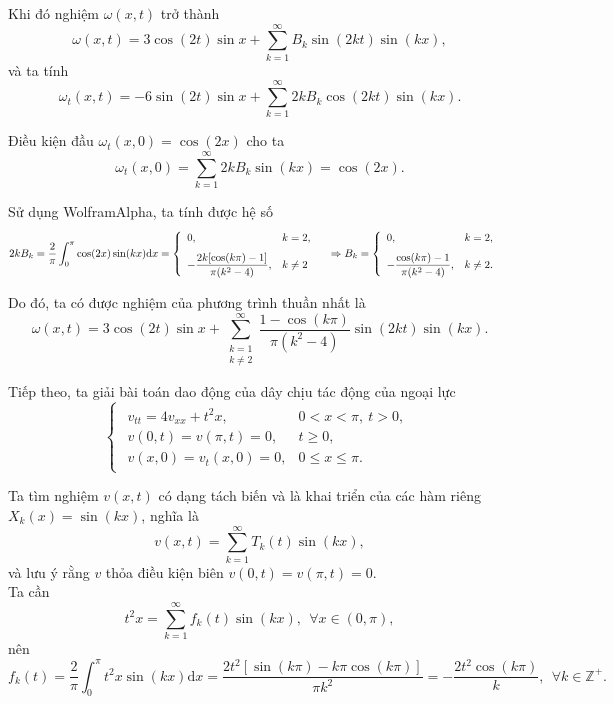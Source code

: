 \documentclass[10pt, a4paper]{article}
\begin{document}
	Khi đó nghiệm $\omega(x,t)$ trở thành $$\omega(x,t)=3\cos(2t)\sin x+\sum_{k=1}^\infty B_k\sin(2kt)\sin(kx),$$
	và ta tính $$\omega_t(x,t)=-6\sin(2t)\sin x+\sum_{k=1}^\infty2kB_k\cos(2kt)\sin(kx).$$
	
	Điều kiện đầu $\omega_t(x,0)=\cos(2x)$ cho ta $$\omega_t(x,0)=\sum_{k=1}^\infty2kB_k\sin(kx)=\cos(2x).$$
	
	Sử dụng WolframAlpha, ta tính được hệ số $$2kB_k=\frac2\pi\int_0^\pi\cos(2x)\sin(kx)\mathrm dx=\begin{cases}
		\begin{array}{ll}
			0, & k=2, \\
			\noalign{\vskip7pt}
			-\dfrac{2k[\cos(k\pi)-1]}{\pi(k^2-4)}, & k\ne2
		\end{array}
	\end{cases}\Rightarrow B_k=\begin{cases}
		\begin{array}{ll}
			0, & k=2, \\
			\noalign{\vskip7pt}
			-\dfrac{\cos(k\pi)-1}{\pi(k^2-4)}, & k\ne2.
		\end{array}
	\end{cases}$$
	
	Do đó, ta có được nghiệm của phương trình thuần nhất là $$\omega(x,t)=3\cos(2t)\sin x+\sum_{\substack{k=1\\k\ne2}}^\infty\dfrac{1-\cos(k\pi)}{\pi(k^2-4)}\sin(2kt)\sin(kx).$$
	
	Tiếp theo, ta giải bài toán dao động của dây chịu tác động của ngoại lực $$\begin{cases}
		\begin{array}{ll}
			v_{tt}=4v_{xx}+t^2x, & 0<x<\pi,~t>0, \\
			v(0,t)=v(\pi,t)=0, & t\ge0,\\
			v(x,0)=v_t(x,0)=0, & 0\le x\le\pi.
		\end{array}
	\end{cases}$$
	
	Ta tìm nghiệm $v(x,t)$ có dạng tách biến và là khai triển của các hàm riêng $X_k(x)=\sin(kx)$, nghĩa là $$v(x,t)=\sum_{k=1}^\infty T_k(t)\sin(kx),$$
	và lưu ý rằng $v$ thỏa điều kiện biên $v(0,t)=v(\pi,t)=0$.\\
	
	Ta cần $$t^2x=\sum_{k=1}^\infty f_k(t)\sin(kx),~~\forall x\in(0,\pi),$$
	nên $$f_k(t)=\frac2\pi\int_0^\pi t^2x\sin(kx)\mathrm dx=\frac{2t^2[\sin(k\pi)-k\pi\cos(k\pi)]}{\pi k^2}=-\frac{2t^2\cos(k\pi)}{k},~~\forall k\in\mathbb Z^+.$$
	
\end{document}
